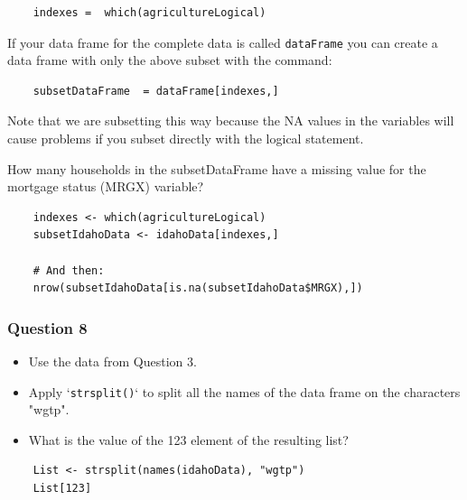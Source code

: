\documentclass{beamer}
\begin{document}
\begin{frame}[fragile]
	
\begin{framed} 
\begin{verbatim}
	indexes =  which(agricultureLogical) 
\end{verbatim}
\end{framed} 

If your data frame for the complete data is called \texttt{dataFrame} you can create a data frame 
with only the above subset with the command: 

\end{frame}
\begin{frame}[fragile]
	
\begin{framed} 
	\begin{verbatim}
	subsetDataFrame  = dataFrame[indexes,] 
	\end{verbatim}
\end{framed} 

\noindent Note that we are subsetting this way because the NA values in the variables 
will cause problems if you subset directly with the logical statement. 

\end{frame}
\begin{frame}[fragile]
	
\noindent How many households in the subsetDataFrame have a missing value for the mortgage status 
(MRGX) variable?

\begin{framed} 
	\begin{verbatim}
	indexes <- which(agricultureLogical)
	subsetIdahoData <- idahoData[indexes,]
	
	# And then:
	nrow(subsetIdahoData[is.na(subsetIdahoData$MRGX),])
	\end{verbatim}
\end{framed} 

\end{frame}
\begin{frame}[fragile]
	
\frametitle{Question 8}
\begin{itemize}
	\item Use the data from Question 3.
	\item Apply `\texttt{strsplit()}` to split all the names of the data frame on the characters "wgtp". 
	\item What is the value of the 123 element of the resulting list?
\end{itemize}

\begin{framed} \begin{verbatim}
	List <- strsplit(names(idahoData), "wgtp")
	List[123]
	\end{verbatim}\end{framed} 

\end{frame}
\end{document}
